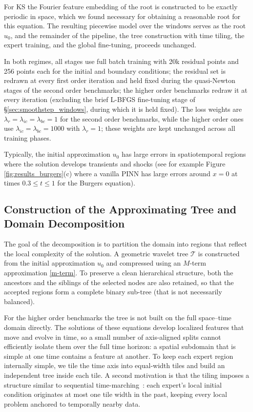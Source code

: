For KS the Fourier feature embedding of the root is constructed to be exactly periodic in space, which we found necessary for obtaining a reasonable root for this equation. The resulting piecewise model over the windows serves as the root $u_0$, and the remainder of the pipeline, the tree construction with time tiling, the expert training, and the global fine-tuning, proceeds unchanged.

In both regimes, all stages use full batch training with 20k residual points and 256 points each for the initial and boundary conditions; the residual set is redrawn at every first order iteration and held fixed during the quasi-Newton stages of the second order benchmarks; the higher order benchmarks redraw it at every iteration (excluding the brief L-BFGS fine-tuning stage of \S\ref{sec:smoothstep_windows}, during which it is held fixed). The loss weights are $\lambda_r = \lambda_{ic} = \lambda_{bc} = 1$ for the second order benchmarks, while the higher order ones use $\lambda_{ic} = \lambda_{bc} = 1000$ with $\lambda_r = 1$; these weights are kept unchanged across all training phases.

Typically, the initial approximation $u_0$ has large errors in spatiotemporal regions where the solution develops transients and shocks (see for example Figure \ref{fig:results_burgers}(c) where a vanilla PINN has large errors around $x=0$ at times $0.3\le t \le 1$ for the Burgers equation). 

\vspace{0.5em}

\subsection{Construction of the Approximating Tree and Domain Decomposition}
\label{sec:tree_construction}

The goal of the decomposition is to partition the domain into regions that
reflect the local complexity of the solution. A geometric wavelet tree
$\mathcal{T}$ is constructed from the initial approximation $u_0$ and
compressed using an $M$-term approximation \eqref{m-term}. To preserve a clean
hierarchical structure, both the ancestors and the siblings of the selected nodes are also retained, so that the accepted regions form a complete binary sub-tree (that is not necessarily balanced).

For the higher order benchmarks the tree is not built on the full space--time domain directly. The solutions of these equations develop
localized features that move and evolve in time, so a small number of
axis-aligned splits cannot efficiently isolate them over the full time horizon: a spatial subdomain that is simple at one time contains a feature at another. To keep each expert region internally simple, we tile the time axis into equal-width tiles and build an independent tree inside each tile. A second motivation is that the tiling imposes a structure similar to sequential time-marching~\cite{wight2021timeadaptive}: each expert's local initial condition originates at most one tile width in the past, keeping every local problem anchored to temporally nearby data.

